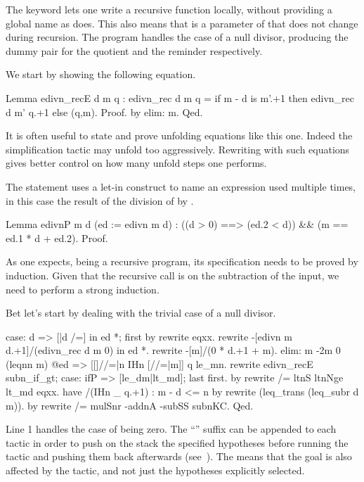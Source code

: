 The  keyword lets one write a recursive function locally, without
providing a global name as  does.  This also means that 
is a parameter of  that does not change during recursion.
The  program handles the case of a null divisor, producing
the dummy pair  for the quotient and the reminder respectively.

We start by showing the following equation.

\begin{coq}{}{}
Lemma edivn_recE d m q :
 edivn_rec d m q = if m - d is m'.+1 then edivn_rec d m' q.+1 else (q,m).
Proof. by elim: m. Qed.
\end{coq}
It is often useful to state and prove unfolding equations like this one.
Indeed the simplification tactic \C{/=} may unfold too aggressively.
Rewriting with such equations gives better control on how many
unfold steps one performs.

The statement uses a let-in construct to name an expression used multiple
times, in this case the result of the division of  by .

\begin{coq}{}{}
Lemma edivnP m d (ed := edivn m d) :
  ((d > 0) ==> (ed.2 < d)) && (m == ed.1 * d + ed.2).
Proof.
\end{coq}

As one expects, being  a recursive program, its specification
needs to be proved by induction.  Given that the recursive call is on
the subtraction of the input, we need to perform a strong induction.

Bet let's start by dealing with the trivial case of a null divisor.

\begin{coq}{}{}
case: d => [|d /=] in ed *; first by rewrite eqxx.
rewrite -[edivn m d.+1]/(edivn_rec d m 0) in ed *.
rewrite -[m]/(0 * d.+1 + m).
elim: m {-2}m 0 (leqnn m) @ed => [[]//=|n IHn [//=|m]] q le_mn.
rewrite edivn_recE subn_if_gt; case: ifP => [le_dm|lt_md]; last first.
  by rewrite /= ltnS ltnNge lt_md eqxx.
have /(IHn _ q.+1) : m - d <= n by rewrite (leq_trans (leq_subr d m)).
by rewrite /= mulSnr -addnA -subSS subnKC.
Qed.
\end{coq}
Line 1 handles the case of  being zero.  The ``'' suffix
can be appended to each tactic in order to push on the stack the specified
hypotheses before running the tactic and pushing them back afterwards (see~\cite[Section 6.5]{ssrman}).
The \C{*} means that the goal is also affected by the tactic, and not just
the hypotheses explicitly selected.

